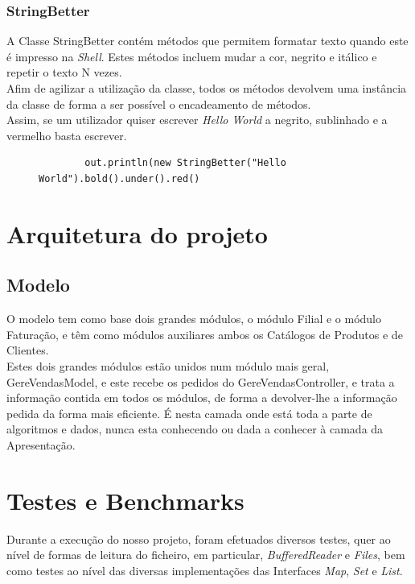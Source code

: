 \documentclass[a4paper]{report}
\begin{document}
\subsection{StringBetter}

A Classe StringBetter contém métodos que permitem formatar texto quando este é impresso na
\textit{Shell}. Estes métodos incluem mudar a cor, negrito e itálico e repetir o texto N vezes.\\
Afim de agilizar a utilização da classe, todos os métodos devolvem uma instância da classe
de forma a ser possível o encadeamento de métodos.\\
Assim, se um utilizador quiser escrever \textit{Hello World} a negrito, sublinhado e a
vermelho basta escrever.
\begin{figure}[H]
    \begin{center}
        \begin{verbatim}
        out.println(new StringBetter("Hello World").bold().under().red()
        \end{verbatim}
    \end{center}
\end{figure}

\chapter{Arquitetura do projeto}

\section{Modelo}

O modelo tem como base dois grandes módulos, o módulo Filial e o módulo Faturação,
e têm como módulos auxiliares ambos os Catálogos de Produtos e de Clientes.\\
Estes dois grandes módulos estão unidos num módulo mais geral, GereVendasModel, 
e este recebe os pedidos do GereVendasController, e trata a informação contida 
em todos os módulos, de forma a devolver-lhe a informação pedida da forma mais 
eficiente. É nesta camada onde está toda a parte de algoritmos e dados, nunca 
esta conhecendo ou dada a conhecer à camada da Apresentação.

\chapter{Testes e Benchmarks}

Durante a execução do nosso projeto, foram efetuados diversos testes, quer ao nível
de formas de leitura do ficheiro, em particular, \textit{BufferedReader} e \textit{Files},
bem como testes ao nível das diversas implementações das Interfaces \textit{Map},
\textit{Set} e \textit{List}.
\end{document}
